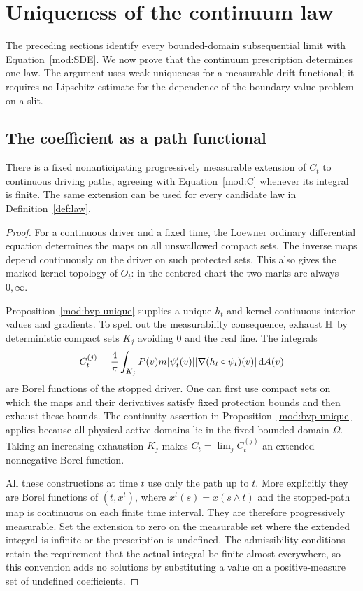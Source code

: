 \section{Uniqueness of the continuum law}\label{sec:uniqueness}

The preceding sections identify every bounded-domain subsequential
limit with Equation~\eqref{mod:SDE}. We now prove that the continuum
prescription determines one law. The argument uses weak uniqueness
for a measurable drift functional; it requires no Lipschitz estimate
for the dependence of the boundary value problem on a slit.

\subsection{The coefficient as a path functional}

\begin{lemma}\label{uni:measurable}
There is a fixed nonanticipating progressively measurable extension
of $C_t$ to continuous driving paths, agreeing with
Equation~\eqref{mod:C} whenever its integral is finite. The same
extension can be used for every candidate law in
Definition~\ref{def:law}.
\end{lemma}

\begin{proof}
For a continuous driver and a fixed time, the Loewner ordinary
differential equation determines the maps on all unswallowed
compact sets. The inverse maps depend continuously on the driver
on such protected sets. This also gives the marked kernel topology
of $O_t$: in the centered chart the two marks are always
$0,\infty$.

Proposition~\ref{mod:bvp-unique} supplies a unique $h_t$ and
kernel-continuous interior values and gradients. To spell out the
measurability consequence, exhaust $\mathbb H$ by deterministic compact
sets $K_j$ avoiding $0$ and the real line. The integrals
\[
 C_t^{(j)}=\frac4\pi\int_{K_j}P(v)m|\psi_t'(v)|
                  |\nabla(h_t\circ\psi_t)(v)|\,\mathrm d A(v)
\]
are Borel functions of the stopped driver. One can first use compact
sets on which the maps and their derivatives satisfy fixed
protection bounds and then exhaust these bounds. The continuity
assertion in Proposition~\ref{mod:bvp-unique} applies because all
physical active domains lie in the fixed bounded domain $\Omega$.
Taking an increasing exhaustion $K_j$ makes
$C_t=\lim_j C_t^{(j)}$ an extended nonnegative Borel function.

All these constructions at time $t$ use only the path up to $t$.
More explicitly they are Borel functions of $(t,x^t)$, where
$x^t(s)=x(s\wedge t)$ and the stopped-path map is continuous on
each finite time interval. They are therefore progressively
measurable. Set the extension to zero on the measurable set where
the extended integral is infinite or the prescription is undefined.
The admissibility conditions retain the requirement that the actual
integral be finite almost everywhere, so this convention adds no
solutions by substituting a value on a positive-measure set of
undefined coefficients.
\end{proof}

